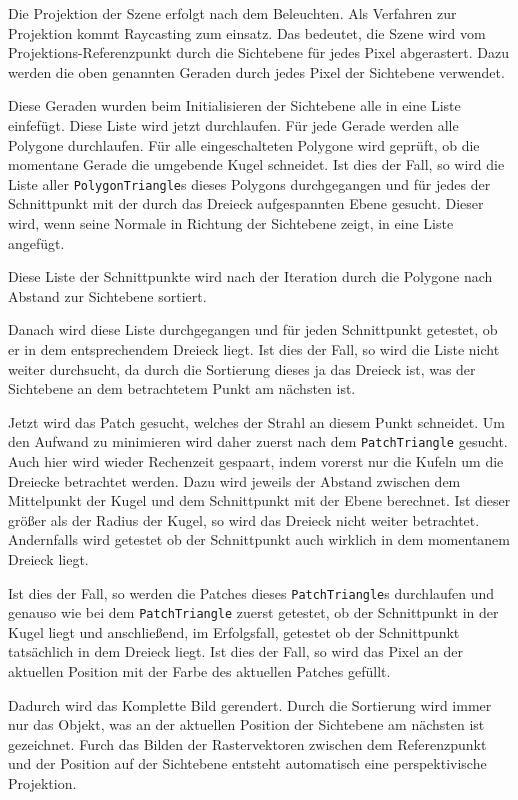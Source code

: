 \documentclass[final,a4paper,11pt,notitlepage,halfparskip]{scrreprt}
\begin{document}
Die Projektion der Szene erfolgt nach dem Beleuchten. Als Verfahren zur
Projektion kommt Raycasting zum einsatz. Das bedeutet, die Szene wird vom
Projektions-Referenzpunkt durch die Sichtebene für jedes Pixel abgerastert. Dazu
werden die oben genannten Geraden durch jedes Pixel der Sichtebene verwendet.

Diese Geraden wurden beim Initialisieren der Sichtebene alle in eine Liste
einfefügt. Diese Liste wird jetzt durchlaufen. Für jede Gerade werden alle
Polygone durchlaufen. Für alle eingeschalteten Polygone wird geprüft, ob die
momentane Gerade die umgebende Kugel schneidet.  Ist dies der Fall, so wird die
Liste aller \texttt{PolygonTriangle}s dieses Polygons durchgegangen und für
jedes der Schnittpunkt mit der durch das Dreieck aufgespannten Ebene gesucht.
Dieser wird, wenn seine Normale in Richtung der Sichtebene zeigt, in eine Liste
angefügt. 

Diese Liste der Schnittpunkte wird nach der Iteration durch die Polygone nach
Abstand zur Sichtebene sortiert.

Danach wird diese Liste durchgegangen und für jeden Schnittpunkt getestet, ob
er in dem entsprechendem Dreieck liegt. Ist dies der Fall, so wird die Liste
nicht weiter durchsucht, da durch die Sortierung dieses ja das Dreieck ist, was
der Sichtebene an dem betrachtetem Punkt am nächsten ist.

Jetzt wird das Patch gesucht, welches der Strahl an diesem Punkt schneidet. Um
den Aufwand zu minimieren wird daher zuerst nach dem \texttt{PatchTriangle}
gesucht. Auch hier wird wieder Rechenzeit gespaart, indem vorerst nur die Kufeln
um die Dreiecke betrachtet werden. Dazu wird jeweils der Abstand zwischen dem
Mittelpunkt der Kugel und dem Schnittpunkt mit der Ebene berechnet. Ist dieser
größer als der Radius der Kugel, so wird das Dreieck nicht weiter betrachtet. 
Andernfalls wird getestet ob der Schnittpunkt auch wirklich in dem momentanem
Dreieck liegt.

Ist dies der Fall, so werden die Patches dieses \texttt{PatchTriangle}s
durchlaufen und genauso wie bei dem \texttt{PatchTriangle} zuerst getestet, ob
der Schnittpunkt in der Kugel liegt und anschließend, im Erfolgsfall, getestet
ob der Schnittpunkt tatsächlich in dem Dreieck liegt. Ist dies der Fall, so wird
das Pixel an der aktuellen Position mit der Farbe des aktuellen Patches gefüllt.

Dadurch wird das Komplette Bild gerendert. Durch die Sortierung wird immer nur
das Objekt, was an der aktuellen Position der Sichtebene am nächsten ist
gezeichnet. Furch das Bilden der Rastervektoren zwischen dem Referenzpunkt und
der Position auf der Sichtebene entsteht automatisch eine perspektivische
Projektion.
\end{document}
